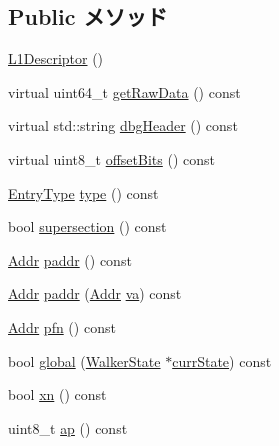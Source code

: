 \subsection*{Public メソッド}
\begin{DoxyCompactItemize}
\item 
\hyperlink{classArmISA_1_1TableWalker_1_1L1Descriptor_a5efa3eba5e8b923e0d061e7d6f781225}{L1Descriptor} ()
\item 
virtual uint64\_\-t \hyperlink{classArmISA_1_1TableWalker_1_1L1Descriptor_a22438a8aab2360360239d433b2f8fc50}{getRawData} () const 
\item 
virtual std::string \hyperlink{classArmISA_1_1TableWalker_1_1L1Descriptor_ac7721f9b49eadf35e0a9f7715a346dbe}{dbgHeader} () const 
\item 
virtual uint8\_\-t \hyperlink{classArmISA_1_1TableWalker_1_1L1Descriptor_ad075c68f96598f36f78db5fbfc3ed339}{offsetBits} () const 
\item 
\hyperlink{classArmISA_1_1TableWalker_1_1L1Descriptor_a9ed8d16c9ae7fae285dd2146c3159023}{EntryType} \hyperlink{classArmISA_1_1TableWalker_1_1L1Descriptor_afeee2b784cb2b021c06cdde9c98130d0}{type} () const 
\item 
bool \hyperlink{classArmISA_1_1TableWalker_1_1L1Descriptor_ab5c6c732aec03fe793fb2f885ecebdb5}{supersection} () const 
\item 
\hyperlink{classm5_1_1params_1_1Addr}{Addr} \hyperlink{classArmISA_1_1TableWalker_1_1L1Descriptor_a26f24be1556c1c0ac2c42e1eff5e1197}{paddr} () const 
\item 
\hyperlink{classm5_1_1params_1_1Addr}{Addr} \hyperlink{classArmISA_1_1TableWalker_1_1L1Descriptor_a4fd8dbd54f4412ba92edbf632940c8de}{paddr} (\hyperlink{classm5_1_1params_1_1Addr}{Addr} \hyperlink{namespaceArmISA_a441099e13f407fadb6bcb0447107de87}{va}) const 
\item 
\hyperlink{classm5_1_1params_1_1Addr}{Addr} \hyperlink{classArmISA_1_1TableWalker_1_1L1Descriptor_ae6bfcb957f6df6777f3294e78ac298af}{pfn} () const 
\item 
bool \hyperlink{classArmISA_1_1TableWalker_1_1L1Descriptor_ad6798ebc36be05efa22b3fb9f3702d83}{global} (\hyperlink{classArmISA_1_1TableWalker_1_1WalkerState}{WalkerState} $\ast$\hyperlink{classArmISA_1_1TableWalker_a5d1a85a0248e318a8191d54988c8782d}{currState}) const 
\item 
bool \hyperlink{classArmISA_1_1TableWalker_1_1L1Descriptor_a88a5985b2a6224e7b546fa088b101d66}{xn} () const 
\item 
uint8\_\-t \hyperlink{classArmISA_1_1TableWalker_1_1L1Descriptor_a4fc87654615da601dbbc3cb6dd1046ee}{ap} () const 

\end{DoxyCompactItemize}
